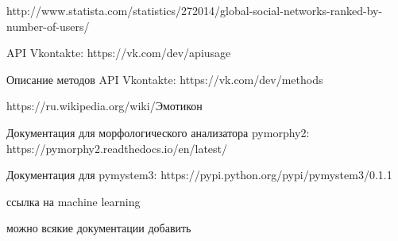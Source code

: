 \documentclass[a4paper]{report}
\begin{document}
\begin{thebibliography}{9}
		http://www.statista.com/statistics/272014/global-social-networks-ranked-by-number-of-users/
		
		API Vkontakte: https://vk.com/dev/apiusage
		
		Описание методов API Vkontakte: https://vk.com/dev/methods
		
		https://ru.wikipedia.org/wiki/Эмотикон
		
		Документация для морфологического анализатора pymorphy2: https://pymorphy2.readthedocs.io/en/latest/
	
	
		Документация для pymystem3: https://pypi.python.org/pypi/pymystem3/0.1.1
		
		ссылка на machine learning
		
		можно всякие документации добавить

	
		
		

		
		
		
		
		
		
		
		
		

\end{thebibliography}
\end{document}
